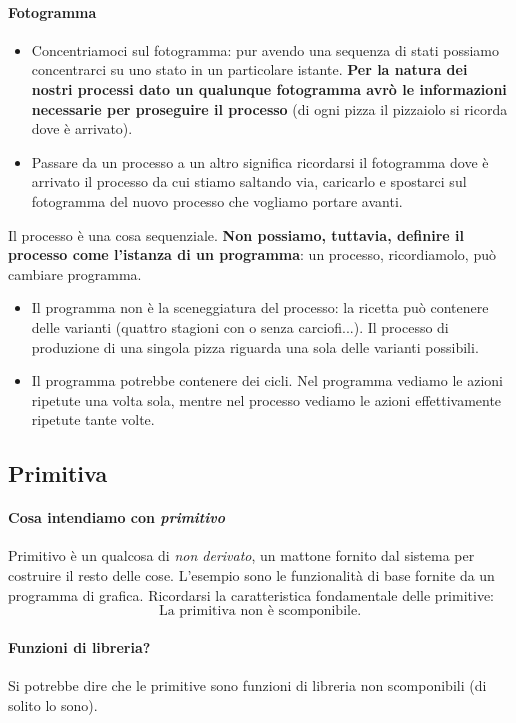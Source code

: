 \documentclass[11pt]{report}
\theoremstyle{definition}
\begin{document}
\paragraph{Fotogramma} 
\begin{itemize}
\item Concentriamoci sul fotogramma: pur avendo una sequenza di stati possiamo concentrarci su uno stato in un particolare istante. \textbf{Per la natura dei nostri processi dato un qualunque fotogramma avrò le informazioni necessarie per proseguire il processo} (di ogni pizza il pizzaiolo si ricorda dove è arrivato).
\item Passare da un processo a un altro significa ricordarsi il fotogramma dove è arrivato il processo da cui stiamo saltando via, caricarlo e spostarci sul fotogramma del nuovo processo che vogliamo portare avanti.
\end{itemize} Il processo è una cosa sequenziale. \textbf{Non possiamo, tuttavia, definire il processo come l'istanza di un programma}: un processo, ricordiamolo, può cambiare programma. 
\begin{itemize}
	\item  Il programma non è la sceneggiatura del processo: la ricetta può contenere delle varianti (quattro stagioni con o senza carciofi...). Il processo di produzione di una singola pizza riguarda una sola delle varianti possibili.
	\item Il programma potrebbe contenere dei cicli. Nel programma vediamo le azioni ripetute una volta sola, mentre nel processo vediamo le azioni effettivamente ripetute tante volte.
\end{itemize}

\subsection{Primitiva}
\paragraph{Cosa intendiamo con \emph{primitivo}} Primitivo è un qualcosa di \textit{non derivato}, un mattone fornito dal sistema per costruire il resto delle cose. L'esempio sono le funzionalità di base fornite da un programma di grafica. Ricordarsi la caratteristica fondamentale delle primitive:
\[\boxed{\text{La primitiva non è scomponibile.}}\]
\paragraph{Funzioni di libreria?} Si potrebbe dire che le primitive sono funzioni di libreria non scomponibili (di solito lo sono).
\end{document}

